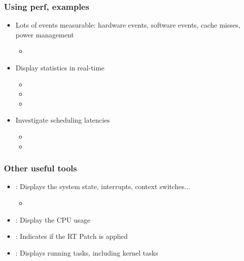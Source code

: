 \begin{frame}
	\frametitle{Using perf, examples}
	\begin{itemize}
		\item Lots of events measurable: hardware events, software events, cache misses, power management
			\begin{itemize}
				\item {}
			\end{itemize}
		\item Display statistics in real-time
			\begin{itemize}
				\item {}
				\item {}
				\item {}
			\end{itemize}
		\item Investigate scheduling latencies
			\begin{itemize}
				\item {}
				\item {}
			\end{itemize}
	\end{itemize}
\end{frame}

\begin{frame}
	\frametitle{Other useful tools}
	\begin{itemize}
		\item {}: Displays the system state, interrupts, context switches...
			\begin{itemize}
				\item {}
			\end{itemize}
		\item {}: Display the CPU usage
		\item {}: Indicates if the RT Patch is applied
		\item {}: Displays running tasks, including kernel tasks
	\end{itemize}
\end{frame}

